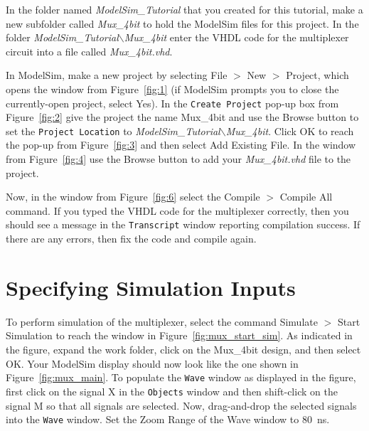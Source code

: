 \documentclass[11pt, twoside, pdftex]{article}
\begin{document}
In the folder named {\it ModelSim\_Tutorial} that you created for this tutorial, make a new
subfolder called {\it Mux\_4bit} to hold the ModelSim files for this project.
In the folder {\it ModelSim\_Tutorial$\backslash$Mux\_4bit} enter the VHDL code for 
the multiplexer circuit into a file called {\it Mux\_4bit.vhd}.

In ModelSim, make a new project by selecting {\sf File $>$ New $>$ Project}, which opens the window 
from Figure~\ref{fig:1} (if ModelSim prompts you to close the currently-open project, 
select {\sf Yes}).  In the \texttt{Create Project} pop-up box from Figure~\ref{fig:2} give 
the project the name {\sf Mux\_4bit} and use the {\sf Browse} button to set the 
\texttt{Project Location} to {\it ModelSim\_Tutorial$\backslash$Mux\_4bit}. 
Click {\sf OK} to reach the pop-up from Figure~\ref{fig:3} and then select 
{\sf Add Existing File}. In the window from Figure~\ref{fig:4} use the {\sf Browse} button 
to add your {\it Mux\_4bit.vhd} file to the project. 

Now, in the window from Figure~\ref{fig:6} select the {\sf Compile $>$ Compile All} command.
If you typed the VHDL code for the multiplexer correctly, then you should see a message in the
\texttt{Transcript} window reporting compilation success. If there are any errors, then fix 
the code and compile again.

\section{Specifying Simulation Inputs}

To perform simulation of the multiplexer, select the command {\sf Simulate $>$ Start Simulation}
to reach the window in Figure~\ref{fig:mux_start_sim}. As indicated in the figure, expand the 
{\sf work} folder, click on the {\sf Mux\_4bit} design, and then select {\sf OK}. Your ModelSim
display should now look like the one shown in Figure~\ref{fig:mux_main}. To populate the 
\texttt{Wave} window as displayed in the figure, first click on the signal {\sf X} in the 
\texttt{Objects} window and then shift-click on the signal {\sf M} so that all signals are selected.
Now, drag-and-drop the selected signals into the \texttt{Wave} window. Set the {\sf Zoom Range} 
of the Wave window to 80~ns.
~\\
\end{document}
